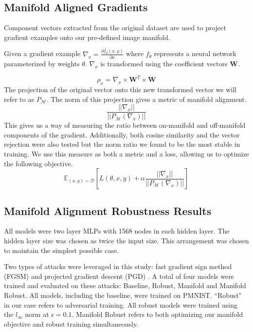 \subsection{Manifold Aligned Gradients} \label{subsec:ma}

Component vectors extracted from the original dataset are used to project gradient examples onto our pre-defined image manifold.

Given a gradient example $\nabla_x = \frac{\partial f_\theta(x, y)}{\partial x}$ where $f_\theta$ represents a neural network parameterized by weights $\theta$. $\nabla_x$ is transformed using the coefficient vectors \textbf{W}.

\begin{equation}
    \rho_x = \nabla_x \times \textbf{W}^T \times \textbf{W}    
\end{equation}
The projection of the original vector onto this new transformed vector we will refer to as $P_{\mathcal{M}}$.
The norm of this projection gives a metric of manifold alignment.
\begin{equation}
    \frac{|| \nabla_x || }{||P_{\mathcal{M}}(\nabla_x )||}
  \label{equ:ratio}
\end{equation}
This gives us a way of measuring the ratio between on-manifold and off-manifold components of the gradient.
Additionally, both cosine similarity and the vector rejection were also tested but the norm ratio we found to be the most stable in training.
We use this measure as both a metric and a loss, allowing us to optimize the following objective.
\begin{equation}
  \mathds{E}_{(x,y) \sim \mathcal{D}} \left[ L(\theta, x,y)  + \alpha \frac{|| \nabla_x || }{||P_{\mathcal{M}}(\nabla_x )||} \right]
  \label{equ:loss}
\end{equation}

\subsection{Manifold Alignment Robustness Results}

All models were two layer MLPs with 1568 nodes in each hidden layer.
The hidden layer size was chosen as twice the input size.
This arrangement was chosen to maintain the simplest possible case.

Two types of attacks were leveraged in this study: fast gradient sign method (FGSM) \citep{goodfellow_explaining_2014} and projected gradient descent (PGD) \citep{madry_towards_2017}.
A total of four models were trained and evaluated on these attacks: Baseline, Robust, Manifold and Manifold Robust.
All models, including the baseline, were trained on PMNIST.
``Robust" in our case refers to adversarial training.
All robust models were trained using the $l_\infty$ norm at $\epsilon = 0.1$.
Manifold Robust refers to both optimizing our manifold objective and robust training simultaneously.

